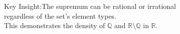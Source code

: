 \documentclass[preview]{standalone}
\begin{document}
\begin{center}
Key Insight:The supremum can be rational or irrational\\regardless of the set's element types.\\This demonstrates the density of $\mathbb{Q}$ and $\mathbb{R}\setminus\mathbb{Q}$ in $\mathbb{R}$.
\end{center}
\end{document}
